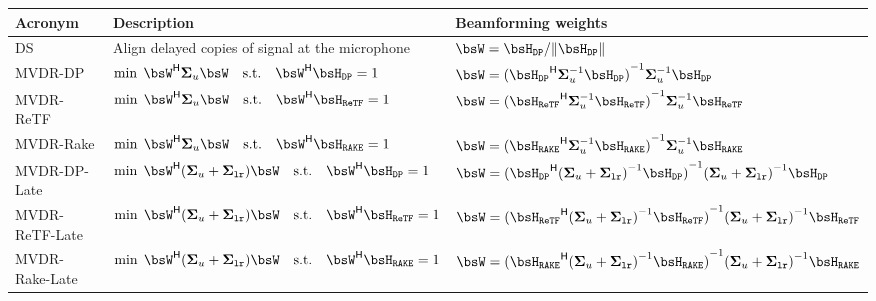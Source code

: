 \begin{tabular*}{\linewidth}{lll}
\toprule
Acronym & Description & Beamforming weights \\
\midrule
DS              & Align delayed copies of signal at the microphone
                    &  $\bsW = \FLTS_\mathtt{DP} / \kvvbar{\FLTS_\mathtt{DP}} $ \\
MVDR-DP         & $\min\; \khermitian{\bsW} \xpsd_{u} \bsW \quad \text{s.t.} \quad \khermitian{\bsW} \FLTS_\mathtt{DP} = 1$
                    &  $\bsW = \kinv{(\khermitian{\FLTS_\mathtt{DP}} \kinv{\xpsd}_{u}  \FLTS_\mathtt{DP})} \kinv{\xpsd}_{u}  \FLTS_\mathtt{DP}$\\
MVDR-ReTF        & $\min\; \khermitian{\bsW} \xpsd_{u} \bsW \quad \text{s.t.} \quad \khermitian{\bsW} \FLTS_\mathtt{ReTF} = 1$
                    &  $\bsW = \kinv{(\khermitian{\FLTS_\mathtt{ReTF}} \kinv{\xpsd}_{u}  \FLTS_\mathtt{ReTF})} \kinv{\xpsd}_{u}  \FLTS_\mathtt{ReTF}$\\
MVDR-Rake       & $\min\; \khermitian{\bsW} \xpsd_{u} \bsW \quad \text{s.t.} \quad \khermitian{\bsW} \FLTS_\mathtt{RAKE} = 1$
                    &  $\bsW = \kinv{(\khermitian{\FLTS_\mathtt{RAKE}} \kinv{\xpsd}_{u}  \FLTS_\mathtt{RAKE})} \kinv{\xpsd}_{u}  \FLTS_\mathtt{RAKE}$\\
MVDR-DP-Late    & $\min\; \khermitian{\bsW} (\xpsd_{u} + \xpsd_{\mathtt{lr}}) \bsW \quad \text{s.t.} \quad \khermitian{\bsW} \FLTS_{\mathtt{DP}} = 1$
                    &  $\bsW = \kinv{(\khermitian{\FLTS_\mathtt{DP}} \kinv{(\xpsd_{u} + \xpsd_{\mathtt{lr}})}  \FLTS_\mathtt{DP})} \kinv{(\xpsd_{u} + \xpsd_{\mathtt{lr}})}  \FLTS_\mathtt{DP}$      \\
MVDR-ReTF-Late   & $\min\; \khermitian{\bsW} (\xpsd_{u} + \xpsd_{\mathtt{lr}}) \bsW \quad \text{s.t.} \quad \khermitian{\bsW} \FLTS_{\mathtt{ReTF}} = 1$
                    &  $\bsW = \kinv{(\khermitian{\FLTS_\mathtt{ReTF}} \kinv{(\xpsd_{u} + \xpsd_{\mathtt{lr}})}  \FLTS_\mathtt{ReTF})} \kinv{(\xpsd_{u} + \xpsd_{\mathtt{lr}})}  \FLTS_\mathtt{ReTF}$   \\
MVDR-Rake-Late  & $\min\; \khermitian{\bsW} (\xpsd_{u} + \xpsd_{\mathtt{lr}}) \bsW \quad \text{s.t.} \quad \khermitian{\bsW} \FLTS_{\mathtt{RAKE}} = 1$
                    &  $\bsW = \kinv{(\khermitian{\FLTS_\mathtt{RAKE}} \kinv{(\xpsd_{u} + \xpsd_{\mathtt{lr}})}  \FLTS_\mathtt{RAKE})} \kinv{(\xpsd_{u} + \xpsd_{\mathtt{lr}})}  \FLTS_\mathtt{RAKE}$\\
\bottomrule
\end{tabular*}